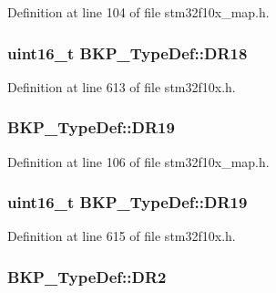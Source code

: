 Definition at line 104 of file stm32f10x\+\_\+map.\+h.

\subsubsection[{\texorpdfstring{D\+R18}{DR18}}]{ {\bf uint16\+\_\+t} B\+K\+P\+\_\+\+Type\+Def\+::\+D\+R18}\hypertarget{struct_b_k_p___type_def_a9a1b09d229ccb45e67108fdfee779d1d}{}\label{struct_b_k_p___type_def_a9a1b09d229ccb45e67108fdfee779d1d}


Definition at line 613 of file stm32f10x.\+h.

\subsubsection[{\texorpdfstring{D\+R19}{DR19}}]{ B\+K\+P\+\_\+\+Type\+Def\+::\+D\+R19}\hypertarget{struct_b_k_p___type_def_aaa205bf55aacc086ba6b3196813c3bf7}{}\label{struct_b_k_p___type_def_aaa205bf55aacc086ba6b3196813c3bf7}


Definition at line 106 of file stm32f10x\+\_\+map.\+h.

\subsubsection[{\texorpdfstring{D\+R19}{DR19}}]{ {\bf uint16\+\_\+t} B\+K\+P\+\_\+\+Type\+Def\+::\+D\+R19}\hypertarget{struct_b_k_p___type_def_a7bddb28e7571f4c91ad1990123a61d7e}{}\label{struct_b_k_p___type_def_a7bddb28e7571f4c91ad1990123a61d7e}


Definition at line 615 of file stm32f10x.\+h.

\subsubsection[{\texorpdfstring{D\+R2}{DR2}}]{ B\+K\+P\+\_\+\+Type\+Def\+::\+D\+R2}\hypertarget{struct_b_k_p___type_def_ab4635ed2efafd6f21c7f3a4387ea7182}{}\label{struct_b_k_p___type_def_ab4635ed2efafd6f21c7f3a4387ea7182}


